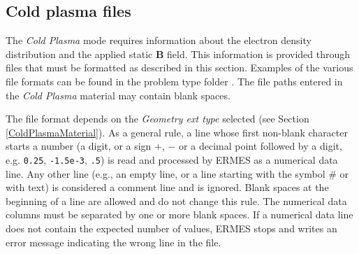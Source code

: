 \subsection{Cold plasma files}\label{ColdPlasmaFiles}

The \textit{Cold Plasma} mode requires information about the electron density distribution and the applied static \textbf{B} field. This information is provided through files that must be formatted as described in this section. Examples of the various file formats can be found in the problem type folder . The file paths entered in the \textit{Cold Plasma} material may contain blank spaces.

The file format depends on the \emph{Geometry ext type} selected (see Section \ref{ColdPlasmaMaterial}). As a general rule, a line whose first non-blank character starts a number (a digit, or a sign $+$, $-$ or a decimal point followed by a digit, e.g. \texttt{0.25}, \texttt{-1.5e-3}, \texttt{.5}) is read and processed by ERMES as a numerical data line. Any other line (e.g., an empty line, or a line starting with the symbol $\#$ or with text) is considered a comment line and is ignored. Blank spaces at the beginning of a line are allowed and do not change this rule. The numerical data columns must be separated by one or more blank spaces. If a numerical data line does not contain the expected number of values, ERMES stops and writes an error message indicating the wrong line in the  file.

